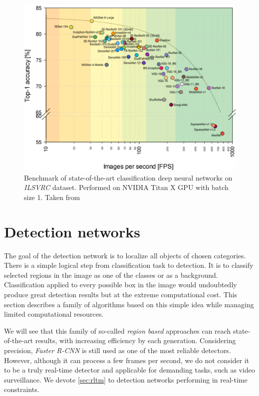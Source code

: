 \begin{figure}
    \includegraphics[width=\textwidth]{img/fps_comp}
    \caption[Benchmark of classification CNNs]%
    {Benchmark of state-of-the-art classification deep neural networks on \textit{ILSVRC} dataset. Performed on NVIDIA
Titan X GPU with batch size 1. Taken from \cite[fig. 3]{bib:cnnbenchmark}}
    \label{fig:cnnbenchmark}
\end{figure}



\section{Detection networks}
\label{sec:detnets}
The goal of the detection network is to localize all objects of chosen categories. There is a simple logical step from classification task to detection. It is to classify selected regions in the image as one of the classes or as a background. Classification applied to every possible box in the image would undoubtedly produce great detection results but at the extreme computational cost. This section describes a family of algorithms based on this simple idea while managing limited computational resources.

We will see that this family of so-called \textit{region based} approaches can reach state-of-the-art results, with increasing efficiency by each generation. Considering precision, \textit{Faster R-CNN} is still used as one of the most reliable detectors. However, although it can process a few frames per second, we do not consider it to be a truly real-time detector and applicable for demanding tasks, such as video surveillance. We devote \cref{sec:rltm} to detection networks performing in real-time constraints.

